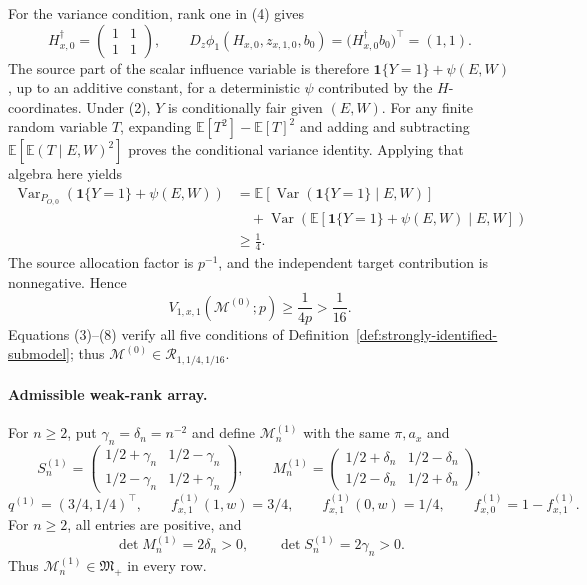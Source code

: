 For the variance condition, rank one in (4) gives
\[
H_{x,0}^{\dagger}=\begin{pmatrix}1&1\\1&1\end{pmatrix},
\qquad
D_z\phi_1(H_{x,0},z_{x,1,0},b_0)
=\bigl(H_{x,0}^{\dagger}b_0\bigr)^{\top}=(1,1).
\tag{6}
\]
The source part of the scalar influence variable is therefore \(\mathbf 1\{Y=1\}+\psi(E,W)\), up to an additive constant, for a deterministic \(\psi\) contributed by the \(H\)-coordinates. Under (2), \(Y\) is conditionally fair given \((E,W)\). For any finite random variable \(T\), expanding \(\mathbb E[T^2]-\mathbb E[T]^2\) and adding and subtracting \(\mathbb E[\mathbb E(T\mid E,W)^2]\) proves the conditional variance identity. Applying that algebra here yields
\[
\begin{aligned}
\operatorname{Var}_{P_{O,0}}\!\left(\mathbf 1\{Y=1\}+\psi(E,W)\right)
&=\mathbb E\!\left[\operatorname{Var}(\mathbf 1\{Y=1\}\mid E,W)\right]\\
&\quad+\operatorname{Var}\!\left(\mathbb E[\mathbf 1\{Y=1\}+\psi(E,W)\mid E,W]\right)\\
&\ge\frac14.
\end{aligned}
\tag{7}
\]
The source allocation factor is \(p^{-1}\), and the independent target contribution is nonnegative. Hence
\[
V_{1,x,1}(\mathcal M^{(0)};p)\ge\frac1{4p}>\frac1{16}.
\tag{8}
\]
Equations (3)--(8) verify all five conditions of Definition~\ref{def:strongly-identified-submodel}; thus \(\mathcal M^{(0)}\in\mathcal R_{1,1/4,1/16}\).

\paragraph{Admissible weak-rank array.}
For \(n\ge2\), put \(\gamma_n=\delta_n=n^{-2}\) and define \(\mathcal M^{(1)}_n\) with the same \(\pi,a_x\) and
\[
S^{(1)}_n=\begin{pmatrix}1/2+\gamma_n&1/2-\gamma_n\\1/2-\gamma_n&1/2+\gamma_n\end{pmatrix},
\qquad
M^{(1)}_n=\begin{pmatrix}1/2+\delta_n&1/2-\delta_n\\1/2-\delta_n&1/2+\delta_n\end{pmatrix},
\]
\[
q^{(1)}=(3/4,1/4)^{\top},\qquad
f^{(1)}_{x,1}(1,w)=3/4,\qquad
f^{(1)}_{x,1}(0,w)=1/4,\qquad
f^{(1)}_{x,0}=1-f^{(1)}_{x,1}.
\tag{9}
\]
For \(n\ge2\), all entries are positive, and
\[
\det M^{(1)}_n=2\delta_n>0,
\qquad
\det S^{(1)}_n=2\gamma_n>0.
\tag{10}
\]
Thus \(\mathcal M^{(1)}_n\in\mathfrak M_{+}\) in every row.

